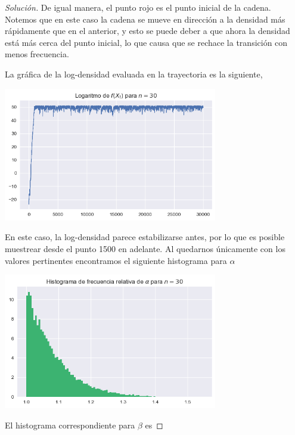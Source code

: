 \documentclass{article}
\begin{document}
\begin{enumerate}
\begin{proof}[Solución]
        De igual manera, el punto rojo es el punto inicial de la cadena. Notemos que en este caso
        la cadena se mueve en dirección a la densidad más rápidamente que en el anterior, y esto
        se puede deber a que ahora la densidad está más cerca del punto inicial, lo que causa que
        se rechace la transición con menos frecuencia.

        La gráfica de la log-densidad evaluada en la trayectoria es la siguiente,

        \begin{center}
            \includegraphics[width=0.7\textwidth]{tarea7/logdensgamma30.png}
        \end{center}

        En este caso, la log-densidad parece estabilizarse antes, por lo que es posible muestrear
        desde el punto 1500 en adelante. Al quedarnos únicamente con los valores pertinentes
        encontramos el siguiente histograma para $\alpha$

        \begin{center}
            \includegraphics[width=0.7\textwidth]{tarea7/histalpha30.png}
        \end{center}

        El histograma correspondiente para $\beta$ es


\end{proof}
\end{enumerate}
\end{document}
